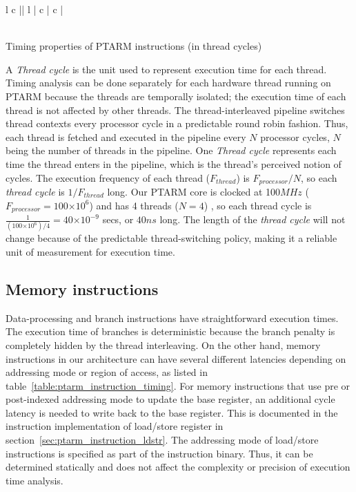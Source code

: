\begin{table}[h]
{\begin{smalltabular}{  l  c || l | c | c | }
   \\
   \\ \hline
\end{smalltabular}}
\vspace{1mm}
\caption{Timing properties of PTARM instructions (in thread cycles)}
\label{table:ptarm_instruction_timing}
\end{table}

\newcommand{\e}[1]{\ensuremath{\times 10^{#1}}}

A \emph{Thread cycle} is the unit used to represent execution time for each thread.  
Timing analysis can be done separately for each hardware thread running on PTARM because the threads are temporally isolated; the execution time of each thread is not affected by other threads.
The thread-interleaved pipeline switches thread contexts every processor cycle in a predictable round robin fashion. 
Thus, each thread is fetched and executed in the pipeline every $N$ processor cycles, $N$ being the number of threads in the pipeline.
One \emph{Thread cycle} represents each time the thread enters in the pipeline, which is the thread's perceived notion of cycles.
The execution frequency of each thread ($F_{thread}$) is $F_{processor}/N$, so each \emph{thread cycle} is $1/F_{thread}$ long. 
Our PTARM core is clocked at 100$MHz$ ($F_{processor} = 100\e{6}$) and has 4 threads ($N=4$) , so each thread cycle is $\frac{1}{(100\e{6})/4} = 40\e{-9}$ secs, or $40ns$ long.
The length of the \emph{thread cycle} will not change because of the predictable thread-switching policy, making it a reliable unit of measurement for execution time.   

\subsection{Memory instructions}
Data-processing and branch instructions have straightforward execution times.
The execution time of branches is deterministic because the branch penalty is completely hidden by the thread interleaving.
On the other hand, memory instructions in our architecture can have several different latencies depending on addressing mode or region of access, as listed in table~\ref{table:ptarm_instruction_timing}.
For memory instructions that use pre or post-indexed addressing mode to update the base register, an additional cycle latency is needed to write back to the base register.
This is documented in the instruction implementation of load/store register in section~\ref{sec:ptarm_instruction_ldstr}.
The addressing mode of load/store instructions is specified as part of the instruction binary.
Thus, it can be determined statically and does not affect the complexity or precision of execution time analysis. 

